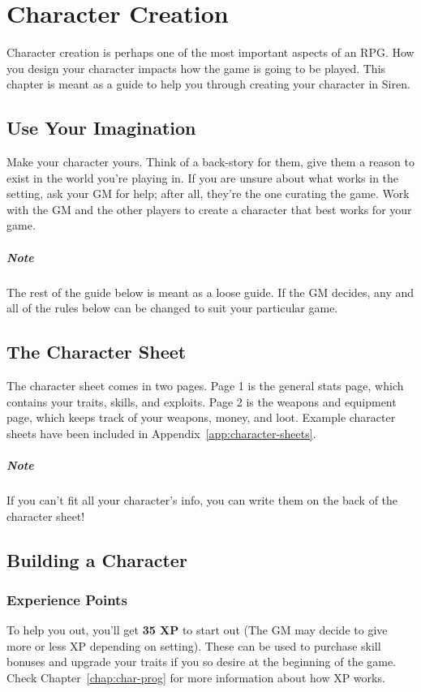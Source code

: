 \chapter{Character Creation}
Character creation is perhaps one of the most important aspects of an RPG.
How you design your character impacts how the game is going to be played.
This chapter is meant as a guide to help you through creating your character in Siren.

\section{Use Your Imagination}
Make your character yours.
Think of a back-story for them, give them a reason to exist in the world you're playing in.
If you are unsure about what works in the setting, ask your GM for help; after all, they're the one curating the game.
Work with the GM and the other players to create a character that best works for your game.

\paragraph{Note} The rest of the guide below is meant as a loose guide.
If the GM decides, any and all of the rules below can be changed to suit your particular game.

\section{The Character Sheet}
The character sheet comes in two pages.
Page 1 is the general stats page, which contains your traits, skills, and exploits.
Page 2 is the weapons and equipment page, which keeps track of your weapons, money, and loot.
Example character sheets have been included in Appendix~\ref{app:character-sheets}.

\paragraph{Note} If you can't fit all your character's info, you can write them on the back of the character sheet!

\section{Building a Character}
\subsection{Experience Points}
To help you out, you'll get \textbf{35 XP} to start out (The GM may decide to give more or less XP depending on setting).
These can be used to purchase skill bonuses and upgrade your traits if you so desire at the beginning of the game.
Check Chapter~\ref{chap:char-prog} for more information about how XP works.

